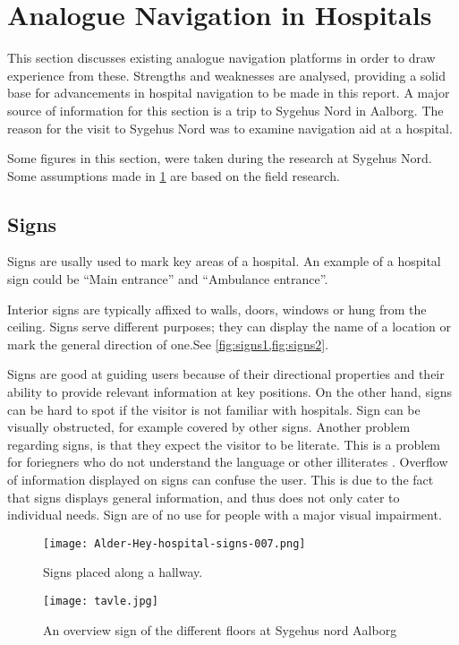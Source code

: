 \section{Analogue Navigation in Hospitals} %
\label{sec:anal_nav}



This section discusses existing analogue navigation platforms in order to draw experience from these. Strengths and weaknesses are analysed, providing a solid base for advancements in hospital navigation to be made in this report. A major source of information for this section is a trip to Sygehus Nord in Aalborg. The reason for the visit to Sygehus Nord was to examine navigation aid at a hospital.

Some figures in this section, were taken during the research at Sygehus Nord. Some assumptions made in \cref{sec:anal_nav} are based on the field research.

\subsection{Signs} \label{sub:sign}
Signs are usally used to mark key areas of a hospital. An example of a hospital sign could be \enquote{Main entrance} and \enquote{Ambulance entrance}\cite{signs_hospital,art_Osborne}.

Interior signs are typically affixed to walls, doors, windows or hung from the ceiling. Signs serve different purposes; they can display the name of a location or mark the general direction of one.See \cref{fig:signs1,fig:signs2}.

Signs are good at guiding users because of their directional properties and their ability to provide relevant information at key positions. On the other hand, signs can be hard to spot if the visitor is not familiar with hospitals. Sign can be visually obstructed, for example covered by other signs. Another problem regarding signs, is that they expect the visitor to be literate. This is a problem for foriegners who do not understand the language or other illiterates \cite{signs_reading}. Overflow of information displayed on signs can confuse the user. This is due to the fact that signs displays general information, and thus does not only cater to individual needs. Sign are of no use for people with a major visual impairment.


\begin{figure}
\centering
  \begin{minipage}{0.45\textwidth}
    \centering
    \texttt{[image: Alder-Hey-hospital-signs-007.png]}
    \caption{Signs placed along a hallway. \cite{signs_hospital}} \label{fig:signs1}
  \end{minipage}
  \hfill
  \begin{minipage}{0.45\textwidth}
    \centering
    \texttt{[image: tavle.jpg]}
    \caption{An overview sign of the different floors at Sygehus nord Aalborg} \label{fig:signs2}
  \end{minipage}
  \end{figure}

